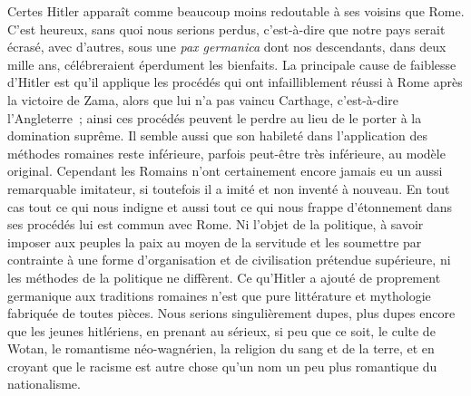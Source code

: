 \documentclass[french,twoside]{book} %
\begin{document}
Certes Hitler apparaît comme beaucoup moins redoutable à ses voisins que Rome. C'est heureux, sans quoi nous serions perdus, c'est-à-dire que notre pays serait écrasé, avec d'autres, sous une {\itshape pax germanica} dont nos descen­dants, dans deux mille ans, célébreraient éperdument les bienfaits. La princi­pale cause de faiblesse d'Hitler est qu'il applique les procédés qui ont infailliblement réussi à Rome après la victoire de Zama, alors que lui n'a pas vaincu Carthage, c'est-à-dire l'Angleterre ; ainsi ces procédés peuvent le perdre au lieu de le porter à la domination suprême. Il semble aussi que son habileté dans l'application des méthodes romaines reste inférieure, parfois peut-être très inférieure, au modèle original. Cependant les Romains n'ont certainement encore jamais eu un aussi remarquable imitateur, si toutefois il a imité et non inventé à nouveau. En tout cas tout ce qui nous indigne et aussi tout ce qui nous frappe d'étonnement dans ses procédés lui est commun avec Rome. Ni l'objet de la politique, à savoir imposer aux peuples la paix au moyen de la servitude et les soumettre par contrainte à une forme d'organi­sation et de civilisation prétendue supérieure, ni les méthodes de la politique ne diffèrent. Ce qu'Hitler a ajouté de proprement germanique aux traditions romaines n'est que pure littérature et mythologie fabriquée de toutes pièces. Nous serions singulièrement dupes, plus dupes encore que les jeunes hitlé­riens, en prenant au sérieux, si peu que ce soit, le culte de Wotan, le romantisme néo-wagnérien, la religion du sang et de la terre, et en croyant que le racisme est autre chose qu'un nom un peu plus romantique du nationalisme.
\end{document}
